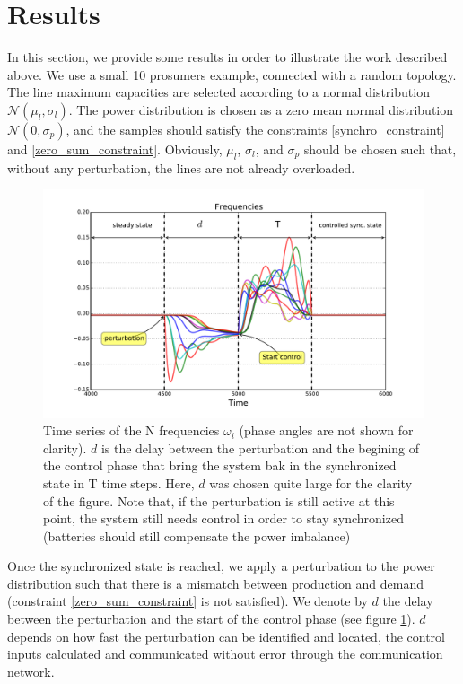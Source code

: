 \documentclass[conference]{IEEEtran}
\begin{document}
\section{Results}
\label{sec:Results}

In this section, we provide some results in order to illustrate the work described above. We use a small 10 prosumers example, connected with a random topology. The line maximum capacities are selected  according to a normal distribution $\mathcal{N}(\mu_l,\sigma_l)$.  The power distribution is chosen as a zero mean normal distribution $ \mathcal{N}(0,\sigma_p) $, and the samples should satisfy the constraints \ref{synchro_constraint} and \ref{zero_sum_constraint}. Obviously, $\mu_l$, $\sigma_l$, and $\sigma_p$ should be chosen such that, without any perturbation, the lines are not already overloaded.

\begin{figure}
\label{fig:frequecies}
\includegraphics[scale=.38]{frequencies}
\caption{Time series of the N frequencies $\omega_i$ (phase angles are not shown for clarity). $d$ is the delay between the perturbation and the begining of the control phase that bring the system bak in the synchronized state in T time steps. Here, $d$ was chosen quite large for the clarity of the figure. Note that, if the perturbation is still active at this point, the system still needs control in order to stay synchronized (batteries should still compensate the power imbalance)}
\end{figure}

Once the synchronized state is reached, we apply a perturbation to the power distribution such that there is a mismatch between production and demand (constraint \ref{zero_sum_constraint} is not satisfied). We denote by $d$ the delay between the perturbation and the start of the control phase (see figure \ref{fig:frequecies}). $d$ depends on how fast the perturbation can be identified and located, the control inputs calculated and communicated without error through the communication network.
\end{document}
